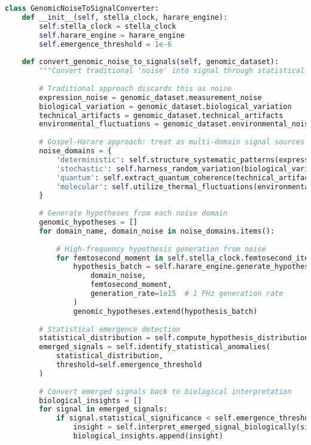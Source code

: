 \documentclass[12pt,a4paper]{article}
\begin{document}
\begin{lstlisting}[language=Python, caption=Practical Genomic Noise-to-Signal Implementation]
class GenomicNoiseToSignalConverter:
    def __init__(self, stella_clock, harare_engine):
        self.stella_clock = stella_clock
        self.harare_engine = harare_engine
        self.emergence_threshold = 1e-6
        
    def convert_genomic_noise_to_signals(self, genomic_dataset):
        """Convert traditional 'noise' into signal through statistical emergence"""
        
        # Traditional approach discards this as noise
        expression_noise = genomic_dataset.measurement_noise
        biological_variation = genomic_dataset.biological_variation  
        technical_artifacts = genomic_dataset.technical_artifacts
        environmental_fluctuations = genomic_dataset.environmental_noise
        
        # Gospel-Harare approach: treat as multi-domain signal sources
        noise_domains = {
            'deterministic': self.structure_systematic_patterns(expression_noise),
            'stochastic': self.harness_random_variation(biological_variation),
            'quantum': self.extract_quantum_coherence(technical_artifacts),
            'molecular': self.utilize_thermal_fluctuations(environmental_fluctuations)
        }
        
        # Generate hypotheses from each noise domain
        genomic_hypotheses = []
        for domain_name, domain_noise in noise_domains.items():
            
            # High-frequency hypothesis generation from noise
            for femtosecond_moment in self.stella_clock.femtosecond_iterator():
                hypothesis_batch = self.harare_engine.generate_hypotheses_from_noise(
                    domain_noise, 
                    femtosecond_moment,
                    generation_rate=1e15  # 1 PHz generation rate
                )
                genomic_hypotheses.extend(hypothesis_batch)
        
        # Statistical emergence detection
        statistical_distribution = self.compute_hypothesis_distribution(genomic_hypotheses)
        emerged_signals = self.identify_statistical_anomalies(
            statistical_distribution, 
            threshold=self.emergence_threshold
        )
        
        # Convert emerged signals back to biological interpretation
        biological_insights = []
        for signal in emerged_signals:
            if signal.statistical_significance < self.emergence_threshold:
                insight = self.interpret_emerged_signal_biologically(signal)
                biological_insights.append(insight)
        

\end{lstlisting}
\end{document}
